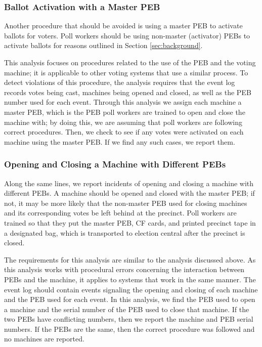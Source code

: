 \subsubsection{Ballot Activation with a Master PEB}
Another procedure that should be avoided is using a master PEB to activate ballots for voters.  Poll workers should be using non-master (activator) PEBs to activate ballots for reasons outlined in Section \ref{sec:background}.

This analysis focuses on procedures related to the use of the PEB and the voting machine; it is applicable to other voting systems that use a similar process.  To detect violations of this procedure, the analysis requires that the event log records votes being cast, machines being opened and closed, as well as the PEB number used for each event.  Through this analysis we assign each machine a master PEB, which is the PEB poll workers are trained to open and close the machine with; by doing this, we are assuming that poll workers are following correct procedures.  Then, we check to see if any votes were activated on each machine using the master PEB.  If we find any such cases, we report them.  

\subsubsection{Opening and Closing a Machine with Different PEBs}
Along the same lines, we report incidents of opening and closing a machine with different PEBs. A machine should be opened and closed with the master PEB; if not, it may be more likely that the non-master PEB used for closing machines and its corresponding votes be left behind at the precinct.  Poll workers are trained so that they put the master PEB, CF cards, and printed precinct tape in a designated bag, which is transported to election central after the precinct is closed.  

The requirements for this analysis are similar to the analysis discussed above.  As this analysis works with procedural errors concerning the interaction between PEBs and the machine, it applies to systems that work in the same manner.  The event log should contain events signaling the opening and closing of each machine and the PEB used for each event.  In this analysis, we find the PEB used to open a machine and the serial number of the PEB used to close that machine.  If the two PEBs have conflicting numbers, then we report the machine and PEB serial numbers.  If the PEBs are the same, then the correct procedure was followed and no machines are reported.  

